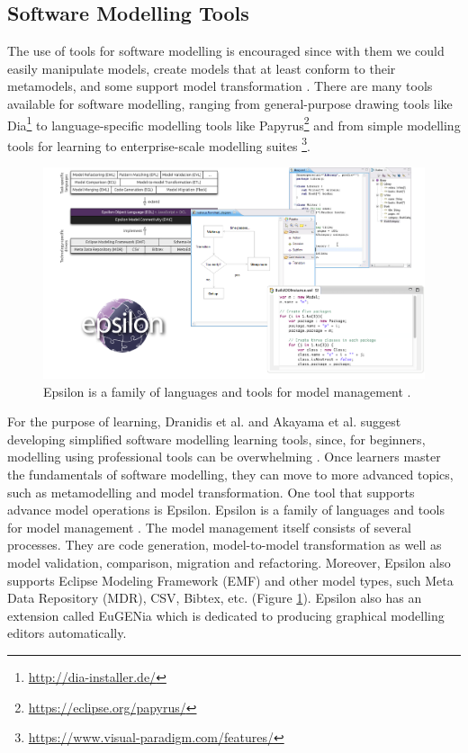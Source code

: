 \documentclass[12pt, a4paper]{report}
\begin{document}
{\subsection{Software Modelling Tools}
The use of tools for software modelling is encouraged since with them we could easily manipulate models, create models that at least conform to their metamodels, and some support model transformation \cite{brambilla2012model}. There are many tools available for software modelling, ranging from general-purpose drawing tools like Dia\footnote{\url{http://dia-installer.de/}} to language-specific modelling tools like Papyrus\footnote{\url{https://eclipse.org/papyrus/}} and from  simple modelling tools for learning \cite{dranidis2015learning} to enterprise-scale modelling suites \footnote{\url{https://www.visual-paradigm.com/features/}}. 

\begin{figure}[!ht]
\centering
\includegraphics[width=\textwidth]{epsilon}
\caption{Epsilon is a family of languages and tools for model management \cite{kolovos2010epsilon}.}
\label{epsilon}
\end{figure}

For the purpose of learning, Dranidis et al. and Akayama et al. suggest developing simplified software modelling learning tools, since, for beginners, modelling using professional tools can be overwhelming \cite{dranidis2015learning, Akayama2013}. Once learners master the fundamentals of software modelling, they can move to more advanced topics, such as metamodelling and model transformation. One tool that supports advance model operations is Epsilon. Epsilon is a family of languages and tools for model management \cite{kolovos2010epsilon}. The model management itself consists of several processes. They are code generation, model-to-model transformation as well as model validation, comparison, migration and refactoring. Moreover, Epsilon also supports Eclipse Modeling Framework (EMF) and other model types, such Meta Data Repository (MDR), CSV, Bibtex, etc. (Figure \ref{epsilon}). Epsilon also has an extension called EuGENia which is dedicated to producing graphical modelling editors automatically\cite{kolovos2015eugenia}.

}
\end{document}
